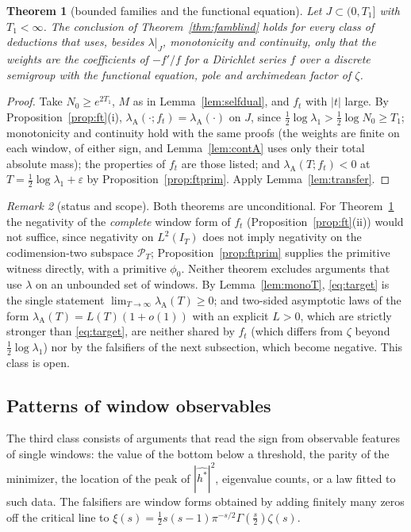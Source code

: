 \documentclass[11pt]{amsart}
\newtheorem{theorem}{Theorem}[section]
\theoremstyle{definition}
\theoremstyle{remark}
\newtheorem{remark}[theorem]{Remark}
\newcommand{\PT}{\mathcal P_T}
\newcommand{\IT}{I_T}
\newcommand{\lamA}{\lambda_{\mathrm A}(T)}
\begin{document}
\begin{theorem}[bounded families and the functional equation]\label{thm:famFE}
Let $J\subset(0,T_1]$ with $T_1<\infty$. The conclusion of Theorem~\ref{thm:famblind}
holds for every class of deductions that uses, besides $\lambda|_J$, monotonicity and
continuity, only that the weights are the coefficients of $-f'/f$ for a Dirichlet series $f$ over a discrete
semigroup with the functional equation, pole and archimedean factor of $\zeta$.
\end{theorem}
\begin{proof}
Take $N_0\ge e^{2T_1}$, $M$ as in Lemma~\ref{lem:selfdual}, and $f_t$ with $|t|$ large. By
Proposition~\ref{prop:ft}(i), $\lambda_{\mathrm A}(\cdot;f_t)=\lambda_{\mathrm A}(\cdot)$ on $J$, since
$\frac12\log\lambda_1>\frac12\log N_0\ge T_1$; monotonicity and
continuity hold with the same proofs (the weights are finite on each window, of either sign, and
Lemma~\ref{lem:contA} uses only their total absolute mass); the properties of $f_t$ are those listed; and
$\lambda_{\mathrm A}(T;f_t)<0$ at $T=\frac12\log\lambda_1+\varepsilon$ by Proposition~\ref{prop:ftprim}. Apply
Lemma~\ref{lem:transfer}.
\end{proof}

\begin{remark}[status and scope]\label{rem:bar-fam}
Both theorems are unconditional. For Theorem~\ref{thm:famFE} the negativity of the \emph{complete} window form of
$f_t$ (Proposition~\ref{prop:ft}(ii)) would not suffice, since negativity on $L^2(\IT)$ does not imply negativity on
the codimension-two subspace $\PT$; Proposition~\ref{prop:ftprim} supplies the primitive witness directly, with a
primitive $\phi_0$. Neither theorem excludes arguments that use $\lambda$ on an unbounded set of windows. By
Lemma~\ref{lem:monoT}, \eqref{eq:target} is the single statement $\lim_{T\to\infty}\lamA\ge0$; and two-sided
asymptotic laws of the form $\lamA=L(T)(1+o(1))$ with an explicit $L>0$, which are strictly stronger than
\eqref{eq:target}, are neither shared by $f_t$ (which differs from $\zeta$ beyond $\frac12\log\lambda_1$) nor by the
falsifiers of the next subsection, which become negative. This class is open.
\end{remark}

\subsection{Patterns of window observables}\label{subsec:bar-pat}

The third class consists of arguments that read the sign from observable features of single windows: the value
of the bottom below a threshold, the parity of the minimizer, the location of the peak of $|\widehat{h^*}|^2$,
eigenvalue counts, or a law fitted to such data. The falsifiers are window forms obtained by adding finitely many
zeros off the critical line to $\xi(s)=\frac12s(s-1)\pi^{-s/2}\Gamma(\frac s2)\zeta(s)$.
\end{document}
